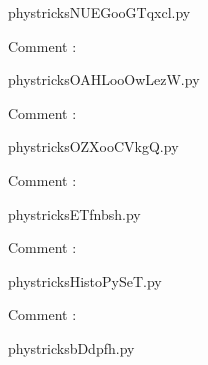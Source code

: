 
    \newcommand{\CaptionFigNUEGooGTqxcl}{<+Type your caption here+>}
    \begin{center}
        
    \end{center}
    phystricksNUEGooGTqxcl.py

    Comment : 

    \clearpage
    


    \newcommand{\CaptionFigOAHLooOwLezW}{<+Type your caption here+>}
    \begin{center}
        
    \end{center}
    phystricksOAHLooOwLezW.py

    Comment : 

    \clearpage
    


    \newcommand{\CaptionFigOZXooCVkgQ}{<+Type your caption here+>}
    \begin{center}
        
    \end{center}
    phystricksOZXooCVkgQ.py

    Comment : 

    \clearpage
    


    \newcommand{\CaptionFigETfnbsh}{<+Type your caption here+>}
    \begin{center}
        
    \end{center}
    phystricksETfnbsh.py

    Comment : 

    \clearpage
    


    \newcommand{\CaptionFigHistoPySeT}{<+Type your caption here+>}
    \begin{center}
        
    \end{center}
    phystricksHistoPySeT.py

    Comment : 

    \clearpage
    


    \newcommand{\CaptionFigbDdpfh}{<+Type your caption here+>}
    \begin{center}
        
    \end{center}
    phystricksbDdpfh.py

